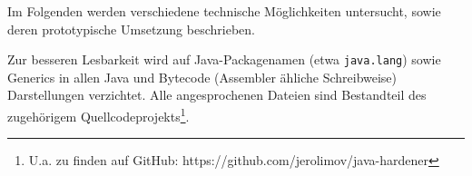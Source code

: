 \vspace{0.3cm}

Im Folgenden werden verschiedene technische Möglichkeiten untersucht,
sowie deren prototypische Umsetzung beschrieben.

Zur besseren Lesbarkeit wird auf Java-Packagenamen (etwa \texttt{java.lang}) sowie Generics
in allen Java und Bytecode (Assembler ähliche Schreibweise) Darstellungen verzichtet.
Alle angesprochenen Dateien sind Bestandteil des zugehörigem Quellcodeprojekts\footnote{U.a. zu finden auf GitHub: https://github.com/jerolimov/java-hardener}.

